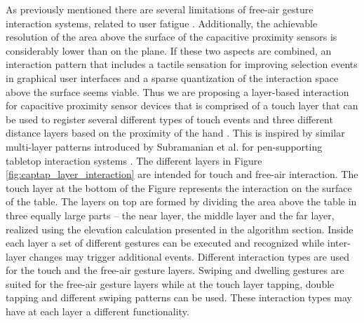 As previously mentioned there are several limitations of free-air gesture interaction systems, related to user fatigue \cite{Baudel1993,lenman2002}. Additionally, the achievable resolution of the area above the surface of the capacitive proximity sensors is considerably lower than on the plane. If these two aspects are combined, an interaction pattern that includes a tactile sensation for improving selection events in graphical user interfaces and a sparse quantization of the interaction space above the surface seems viable. Thus we are proposing a layer-based interaction for capacitive proximity sensor devices that is comprised of a touch layer that can be used to register several different types of touch events and three different distance layers based on the proximity of the hand \cite{Braun2013captap}. This is inspired by similar multi-layer patterns introduced by Subramanian et al. for pen-supporting tabletop interaction systems \cite{subramanian2006multi}. The different layers in Figure \ref{fig:captap_layer_interaction} are intended for touch and free-air interaction. The touch layer at the bottom of the Figure represents the interaction on the surface of the table. The layers on top are formed by dividing the area above the table in three equally large parts – the near layer, the middle layer and the far layer, realized using the elevation calculation presented in the algorithm section. Inside each layer a set of different gestures can be executed and recognized while inter-layer changes may trigger additional events. Different interaction types are used for the touch and the free-air gesture layers. Swiping and dwelling gestures are suited for the free-air gesture layers while at the touch layer tapping, double tapping and different swiping patterns can be used. These interaction types may have at each layer a different functionality.

